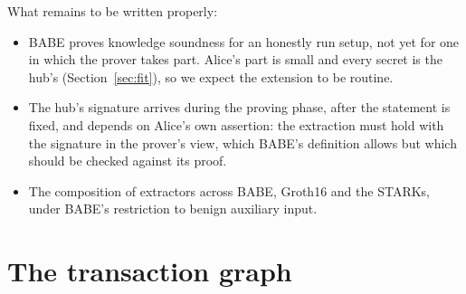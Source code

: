\documentclass[11pt]{article}
\begin{document}
What remains to be written properly:
\begin{itemize}[leftmargin=1.5em]
\item BABE proves knowledge soundness for an honestly run setup, not yet
  for one in which the prover takes part. Alice's part is small and
  every secret is the hub's (Section~\ref{sec:fit}), so we expect the
  extension to be routine.
\item The hub's signature arrives during the proving phase, after the
  statement is fixed, and depends on Alice's own assertion: the
  extraction must hold with the signature in the prover's view, which
  BABE's definition allows but which should be checked against its
  proof.
\item The composition of extractors across BABE, Groth16 and the STARKs,
  under BABE's restriction to benign auxiliary input.
\end{itemize}

\section{The transaction graph}
\label{sec:graph}
\end{document}

